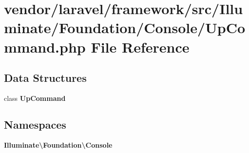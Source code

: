 \section{vendor/laravel/framework/src/\+Illuminate/\+Foundation/\+Console/\+Up\+Command.php File Reference}
\label{_up_command_8php}
\subsection*{Data Structures}
\begin{DoxyCompactItemize}
\item 
class {\bf Up\+Command}
\end{DoxyCompactItemize}
\subsection*{Namespaces}
\begin{DoxyCompactItemize}
\item 
 {\bf Illuminate\textbackslash{}\+Foundation\textbackslash{}\+Console}
\end{DoxyCompactItemize}
